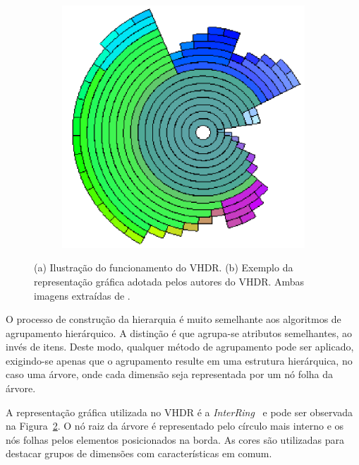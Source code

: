 \begin{figure}[h!]
\begin{subfigure}[b]{0.5\textwidth}
    \includegraphics[width=\textwidth]{images/vhdr2.png}
    \caption{}
    \label{fig:vhdr2}
  \end{subfigure} \caption[VHDR: Visual Hierarchical
  Dimension Reduction]{(a) Ilustração do funcionamento do
  VHDR. (b) Exemplo da representação gráfica adotada pelos
  autores do VHDR. Ambas imagens extraídas de
  \cite{Yang2003}.}
\end{figure}

O processo de construção da hierarquia é muito semelhante
aos algoritmos de agrupamento hierárquico. A distinção é que
agrupa-se atributos semelhantes, ao invés de itens. Deste
modo, qualquer método de agrupamento pode ser aplicado,
exigindo-se apenas que o agrupamento resulte em uma
estrutura hierárquica, no caso uma árvore, onde cada
dimensão seja representada por um nó folha da árvore. 

A representação gráfica utilizada no VHDR é a
\emph{InterRing}~\cite{Yang2002} e pode
ser observada na Figura~\ref{fig:vhdr2}. O nó raiz da árvore
é representado pelo círculo mais interno e os nós folhas
pelos elementos posicionados na borda. As cores são
utilizadas para destacar grupos de dimensões com
características em comum. 

